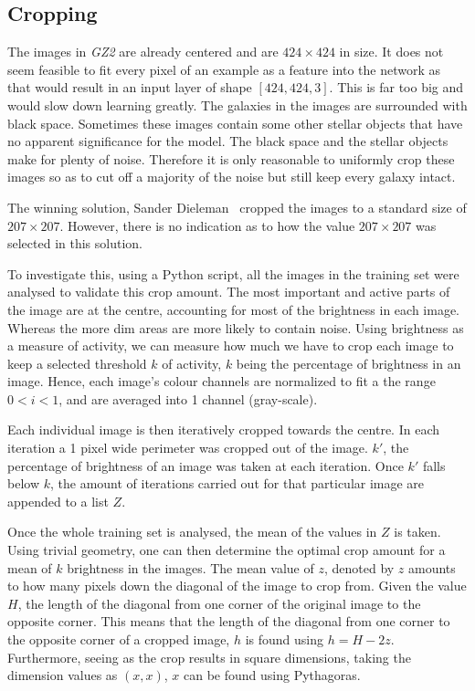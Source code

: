 \documentclass[12pt,a4paper,oneside,oldfontcommands]{memoir}
\begin{document}
\begin{Declaration Of OriginalityOrginality}
\subsection{Cropping} \label{Cropping}

The images in \textit{GZ2} are already centered and are \(424\times424\) in size. It does not seem feasible to fit every pixel of an example as a feature into the network as that would result in an input layer of shape \([424, 424, 3]\). This is far too big and would slow down learning greatly. The galaxies in the images are surrounded with black space. Sometimes these images contain some other stellar objects that have no apparent significance for the model. The black space and the stellar objects make for plenty of noise. Therefore it is only reasonable to uniformly crop these images so as to cut off a majority of the noise but still keep every galaxy intact. 

The winning solution, Sander Dieleman~\cite{Sanders-GZ} cropped the images to a standard size of \(207\times207\). However, there is no indication as to how the value \(207\times207\) was selected in this solution. 

To investigate this, using a Python script, all the images in the training set were analysed to validate this crop amount. The most important and active parts of the image are at the centre, accounting for most of the brightness in each image. Whereas the more dim areas are more likely to contain noise. Using brightness as a measure of activity, we can measure how much we have to crop each image to keep a selected threshold \(k\) of activity, \(k\) being the percentage of brightness in an image. Hence, each image’s colour channels are normalized to fit a the range \(0 < i < 1\), and are averaged into 1 channel (gray-scale).

Each individual image is then iteratively cropped towards the centre. In each iteration a 1 pixel wide perimeter was cropped out of the image. \(k'\), the percentage of brightness of an image was taken at each iteration. Once \(k'\) falls below \(k\), the amount of iterations carried out for that particular image are appended to a list \(Z\).

Once the whole training set is analysed, the mean of the values in \(Z\) is taken. Using trivial geometry, one can then determine the optimal crop amount for a mean of \(k\) brightness in the images. The mean value of \(z\), denoted by \(z\) amounts to how many pixels down the diagonal of the image to crop from. Given the value \(H\), the length of the diagonal from one corner of the original image to the opposite corner. This means that the length of the diagonal from one corner to the opposite corner of a cropped image, \(h\) is found using \(h = H - 2z\). Furthermore, seeing as the crop results in square dimensions, taking the dimension values as \((x, x)\), \(x\) can be found using Pythagoras. 


\end{Declaration Of OriginalityOrginality}
\end{document}
